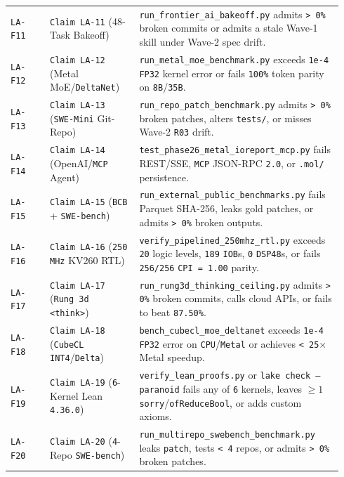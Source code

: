 \documentclass[10pt]{article}
\begin{document}
{\begin{longtable}{@{}L{0.11\linewidth}L{0.25\linewidth}L{0.58\linewidth}@{}}
\texttt{LA-F11} & \texttt{Claim LA-11} (48-Task Bakeoff) & \texttt{run\_frontier\_ai\_bakeoff.py} admits \texttt{> 0\%} broken commits or admits a stale Wave-1 skill under Wave-2 spec drift. \\
\texttt{LA-F12} & \texttt{Claim LA-12} (Metal MoE/\texttt{DeltaNet}) & \texttt{run\_metal\_moe\_benchmark.py} exceeds \texttt{1e-4} \texttt{FP32} kernel error or fails \texttt{100\%} token parity on \texttt{8B}/\texttt{35B}. \\
\texttt{LA-F13} & \texttt{Claim LA-13} (\texttt{SWE-Mini} Git-Repo) & \texttt{run\_repo\_patch\_benchmark.py} admits \texttt{> 0\%} broken patches, alters \texttt{tests/}, or misses Wave-2 \texttt{R03} drift. \\
\texttt{LA-F14} & \texttt{Claim LA-14} (OpenAI/\texttt{MCP} Agent) & \texttt{test\_phase26\_metal\_ioreport\_mcp.py} fails REST/SSE, \texttt{MCP} JSON-RPC \texttt{2.0}, or \texttt{.mol/} persistence. \\
\texttt{LA-F15} & \texttt{Claim LA-15} (\texttt{BCB} + \texttt{SWE-bench}) & \texttt{run\_external\_public\_benchmarks.py} fails Parquet SHA-256, leaks gold patches, or admits \texttt{> 0\%} broken outputs. \\
\texttt{LA-F16} & \texttt{Claim LA-16} (\texttt{250 MHz} KV260 RTL) & \texttt{verify\_pipelined\_250mhz\_rtl.py} exceeds \texttt{20} logic levels, \texttt{189} \texttt{IOB}s, \texttt{0} \texttt{DSP48}s, or fails \texttt{256/256} \texttt{CPI = 1.00} parity. \\
\texttt{LA-F17} & \texttt{Claim LA-17} (\texttt{Rung 3d} \texttt{<think>}) & \texttt{run\_rung3d\_thinking\_ceiling.py} admits \texttt{> 0\%} broken commits, calls cloud APIs, or fails to beat \texttt{87.50\%}. \\
\texttt{LA-F18} & \texttt{Claim LA-18} (\texttt{CubeCL} \texttt{INT4}/\texttt{Delta}) & \texttt{bench\_cubecl\_moe\_deltanet} exceeds \texttt{1e-4} \texttt{FP32} error on \texttt{CPU}/\texttt{Metal} or achieves \texttt{< 25$\times$} Metal speedup. \\
\texttt{LA-F19} & \texttt{Claim LA-19} (\texttt{6}-Kernel Lean \texttt{4.36.0}) & \texttt{verify\_lean\_proofs.py} or \texttt{lake check --paranoid} fails any of \texttt{6} kernels, leaves $\ge 1$ \texttt{sorry}/\texttt{ofReduceBool}, or adds custom axioms. \\
\texttt{LA-F20} & \texttt{Claim LA-20} (\texttt{4}-Repo \texttt{SWE-bench}) & \texttt{run\_multirepo\_swebench\_benchmark.py} leaks \texttt{patch}, tests \texttt{< 4} repos, or admits \texttt{> 0\%} broken patches. \\

\end{longtable}}
\end{document}
